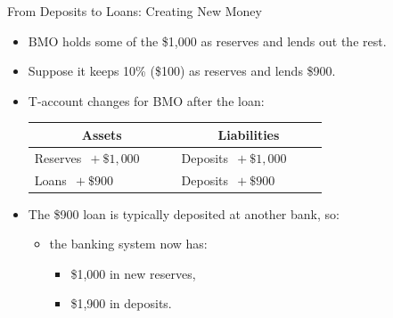 \documentclass[aspectratio=169]{beamer}
\begin{document}
\begin{frame}{From Deposits to Loans: Creating New Money}
\transfade
\begin{itemize}[<+->]
  \item BMO holds some of the \$1{,}000 as reserves and lends out the rest.
  \item Suppose it keeps 10\% (\$100) as reserves and lends \$900.
  \item T-account changes for BMO after the loan:
  \begin{center}
    \begin{tabular}{p{0.4\linewidth} p{0.4\linewidth}}
    \toprule
    \multicolumn{1}{c}{\textbf{Assets}} & \multicolumn{1}{c}{\textbf{Liabilities}} \\
    \midrule
    Reserves \(\,+ \$1{,}000\) & Deposits \(\,+ \$1{,}000\) \\
    Loans \(\,+ \$900\) & Deposits \(\,+ \$900\) \\
    \bottomrule
    \end{tabular}
  \end{center}
  \item The \$900 loan is typically deposited at another bank, so:
  \begin{itemize}[<+->]
    \item the banking system now has:
    \begin{itemize}[<+->]
      \item \$1{,}000 in new reserves,
      \item \$1{,}900 in deposits.
    \end{itemize}
  \end{itemize}
\end{itemize}
\end{frame}
\end{document}
